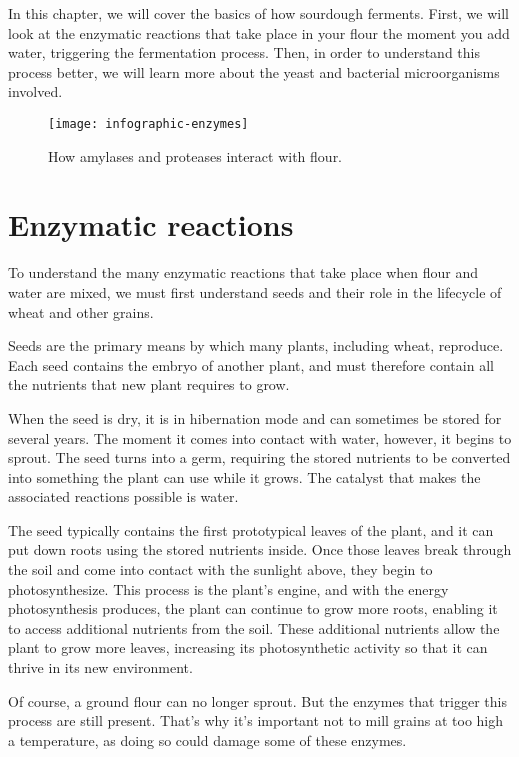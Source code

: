 In this chapter, we will cover the basics of how sourdough ferments.
First, we will look at the enzymatic reactions that take place
in your flour the moment you add water, triggering the fermentation
process. Then, in order to understand this process better, we will
learn more about the yeast and bacterial microorganisms involved.

\begin{figure}[!htb]
  \texttt{[image: infographic-enzymes]}
  \caption{How amylases and proteases interact with flour.}%
  \label{infographic-enzymes}
\end{figure}

\section{Enzymatic reactions}

To understand the many enzymatic reactions that take place when flour
and water are mixed, we must first understand seeds and their role in
the lifecycle of wheat and other grains.

Seeds are the primary means by which many plants, including wheat,
reproduce. Each seed contains the embryo of another plant, and must
therefore contain all the nutrients that new plant requires to grow.

When the seed is dry, it is in hibernation mode and can sometimes be
stored for several years. The moment it comes into contact with water,
however, it begins to sprout. The seed turns into a germ, requiring the
stored nutrients to be converted into something the plant can use while
it grows. The catalyst that makes the associated reactions possible is water.

The seed typically contains the first prototypical leaves of the plant,
and it can put down roots using the stored nutrients inside. Once those leaves
break through the soil and come into contact with the sunlight above, they
begin to photosynthesize. This process is the plant's engine, and with the
energy photosynthesis produces, the plant can continue to grow more roots,
enabling it to access additional nutrients from the soil. These additional
nutrients allow the plant to grow more leaves, increasing its photosynthetic
activity so that it can thrive in its new environment.

Of course, a ground flour can no longer sprout. But the enzymes that
trigger this process are still present. That's why it's important not to
mill grains at too high a temperature, as doing so could damage some of
these enzymes.

